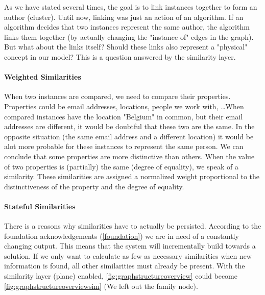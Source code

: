 As we have stated several times, the goal is to link instances together to form an author (cluster). Until now, linking was just an action of an algorithm. If an algorithm decides that two instances represent the same author, the algorithm links them together (by actually changing the "instance of" edges in the graph). But what about the links itself? Should these links also represent a "physical" concept in our model? This is a question answered by the similarity layer.

\paragraph{Weighted Similarities} When two instances are compared, we need to compare their properties. Properties could be email addresses, locations, people we work with, \ldots When compared instances have the location "Belgium" in common, but their email addresses are different, it would be doubtful that these two are the same. In the opposite situation (the same email address and a different location) it would be alot more probable for these instances to represent the same person. We can conclude that some properties are more distinctive than others. When the value of two properties is (partially) the same (degree of equality), we speak of a similarity. These similarities are assigned a normalized weight proportional to the distinctiveness of the property and the degree of equality.


\paragraph{Stateful Similarities} There is a reasons why similarities have to actually be persisted. According to the foundation acknowledgements (\autoref{foundation}) we are in need of a constantly changing output. This means that the system will incrementally build towards a solution. If we only want to calculate as few as necessary similarities when new information is found, all other similarities must already be present. With the similarity layer (plane) enabled, \autoref{fig:graphstructureoverview} could become \autoref{fig:graphstructureoverviewsim} (We left out the family node).

